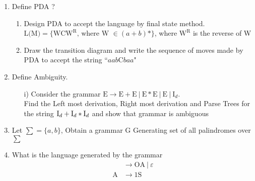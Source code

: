 \documentclass{article}
\begin{document}
\begin{enumerate}[label=\arabic*)]
		\item Define PDA ?
		\begin{enumerate}[label=\roman*)]
			\item Design PDA to accept the language by final state method. \\
				$\text{L(M)} = \{\text{WC}\text{W}^\text{R} \text{, where W } \in (a+b) \ast \}$, where
				$\text{W}^\text{R}$ is the reverse of W
			\item Draw the transition diagram and write the sequence of moves made by PDA to accept the string
				``$aab\text{C}baa$"
		\end{enumerate}
	
		\item Define Ambiguity.
			\begin{itemize}
				\item [i)] Consider the grammar
					$\text{E} \to \text{E}+\text{E}~|~\text{E} \ast \text{E}~|~\text{E}~|~\text{I}_d$. \\
					Find the Left most derivation, Right most derivation and Parse Trees for the string
					$\text{\text{I}}_d+\text{I}_d \ast \text{I}_d$ and show that grammar is ambiguous
			\end{itemize}
	
		\item Let $\sum = \{a,b\}$, Obtain a grammar G Generating set of all palindromes over $\sum$
	
		\item What is the language generated by the grammar
			\begin{align*}
				& \to \text{OA}~|~\varepsilon \\
				\text{A} & \to 1\text{S}
			\end{align*}
	\end{enumerate}
\end{document}
